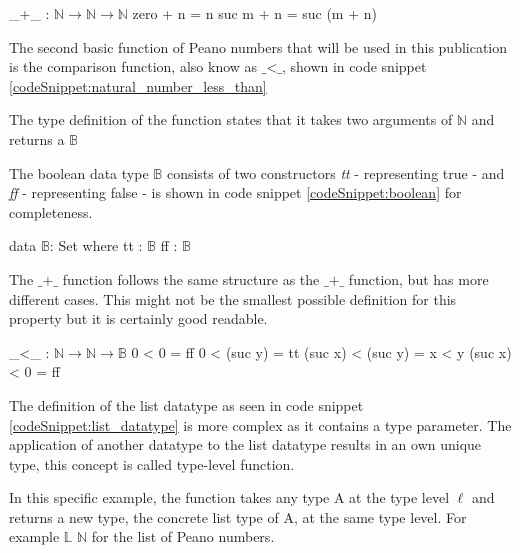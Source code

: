 \begin{codesnippet}[mathescape=true, caption={Peano numbers addition}, label={codeSnippet:natural_number_addition}]
_+_ : $\mathbb{N} \rightarrow \mathbb{N} \rightarrow \mathbb{N}$
zero  + n = n
suc m + n = suc (m + n)
\end{codesnippet}

The second basic function of Peano numbers that will be used in this publication is the comparison function, also know as $\text{\_<\_}$, shown in code snippet \ref{codeSnippet:natural_number_less_than}

The type definition of the function states that it takes two arguments of $\mathbb{N}$ and returns a $\mathbb{B}$

The boolean data type $\mathbb{B}$ consists of two constructors \emph{tt} - representing true - and \emph{ff} - representing false - is shown in code snippet \ref{codeSnippet:boolean} for completeness.

\begin{codesnippet}[mathescape=true, caption={Definition of the boolean data type in Agda}, label={codeSnippet:boolean}]
data $\mathbb{B}$: Set where
  tt : $\mathbb{B}$
  ff  : $\mathbb{B}$
\end{codesnippet}

The $\text{\_+\_}$ function follows the same structure as the $\text{\_+\_}$ function, but has more different cases. 
This might not be the smallest possible definition for this property but it is certainly good readable.

\begin{codesnippet}[mathescape=true, caption={Peano numbers less-than}, label={codeSnippet:natural_number_less_than}]
_<_ : $\mathbb{N} \rightarrow \mathbb{N} \rightarrow \mathbb{B}$
0 < 0 = ff
0 < (suc y) = tt
(suc x) < (suc y) = x < y
(suc x) < 0 = ff
\end{codesnippet}
The definition of the list datatype as seen in code snippet \ref{codeSnippet:list_datatype} is more complex as it contains a type parameter.
The application of another datatype to the list datatype results in an own unique type, this concept is called type-level function.

In this specific example, the function takes any type A at the type level $\ell$ and returns a new type, the concrete list type of A, at the same type level.
For example $\mathbb{L}$ $\mathbb{N}$ for the list of Peano numbers.

